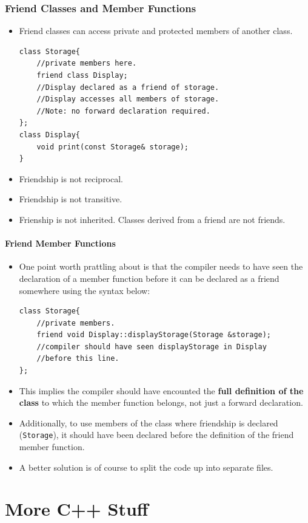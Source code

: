 \documentclass{report}
\begin{document}
\subsection{Friend Classes and Member Functions}
\begin{itemize}
    \item Friend classes can access private and protected members of another class.
\begin{lstlisting}
class Storage{
    //private members here.
    friend class Display;
    //Display declared as a friend of storage.
    //Display accesses all members of storage.
    //Note: no forward declaration required.
};
class Display{
    void print(const Storage& storage);
}
\end{lstlisting}
\item Friendship is not reciprocal.
\item Friendship is not transitive.
\item Frienship is not inherited. Classes derived from a friend are not friends.
\end{itemize}
\subsubsection{Friend Member Functions}
\begin{itemize}
\item One point worth prattling about is that the compiler needs to have seen the declaration of a member function before it can be declared as a friend somewhere using the syntax below:
\begin{lstlisting}
class Storage{
    //private members.
    friend void Display::displayStorage(Storage &storage);
    //compiler should have seen displayStorage in Display 
    //before this line.
};
\end{lstlisting} 
\item This implies the compiler should have encounted the \textbf{full definition of the class} to which the member function belongs, not just a forward declaration.
\item Additionally, to use members of the class where friendship is declared (\texttt{Storage}), it should have been declared before the definition of the friend member function.
\item A better solution is of course to split the code up into separate files.
\end{itemize}
\chapter{More C++ Stuff}
\end{document}
